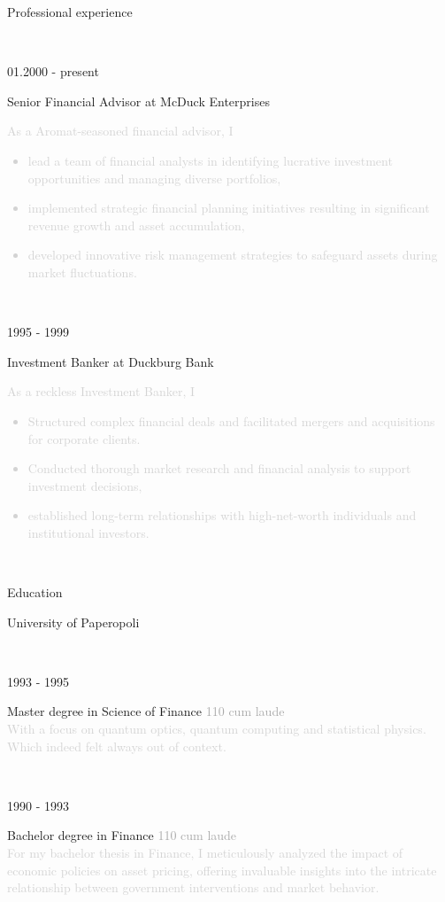 \documentclass[10pt]{article}
\newcommand{\event}[3]{%
	\begin{minipage}[t]{.25\textwidth}
		{\large #1}
	\end{minipage}%
	\begin{minipage}[t]{.75\textwidth}
		{\large #2}\vspace{5pt} \\ 
		{\normalsize \textcolor{lightgray}{#3}}
	\end{minipage}\vspace{20pt}\\
}
\begin{document}
\begin{minipage}{.5\textwidth}
	{\LARGE Professional experience}
\end{minipage}\\

\event{  %
01.2000 - present
}{Senior Financial Advisor at McDuck Enterprises}{
As a Aromat-seasoned financial advisor, I 
\begin{itemize}
\item lead a team of financial analysts in identifying lucrative investment opportunities and managing diverse portfolios,
\item implemented strategic financial planning initiatives resulting in significant revenue growth and asset accumulation,
\item developed innovative risk management strategies to safeguard assets during market fluctuations.
\end{itemize}
}

\event{1995 - 1999}{Investment Banker at Duckburg Bank}{ %
As a reckless Investment Banker, I
\begin{itemize}
\item Structured complex financial deals and facilitated mergers and acquisitions for corporate clients.
\item Conducted thorough market research and financial analysis to support investment decisions,
\item established long-term relationships with high-net-worth individuals and institutional investors.
\end{itemize}}

\hfill 


\begin{minipage}[b]{.25\textwidth}
{\LARGE Education}
\end{minipage}
\begin{minipage}[b]{.75\textwidth}
{\large University of Paperopoli}
\end{minipage}
\\

\event{1993 - 1995}{Master degree in Science of Finance \hfill \textcolor{darkgray}{110 cum laude}}{With a focus on quantum optics, quantum computing and statistical physics. Which indeed felt always out of context.}
\event{1990 - 1993}{Bachelor degree in Finance \hfill \textcolor{darkgray}{110 cum laude}}{
For my bachelor thesis in Finance, I meticulously analyzed the impact of economic policies on asset pricing, offering invaluable insights into the intricate relationship between government interventions and market behavior.
}
\end{document}
